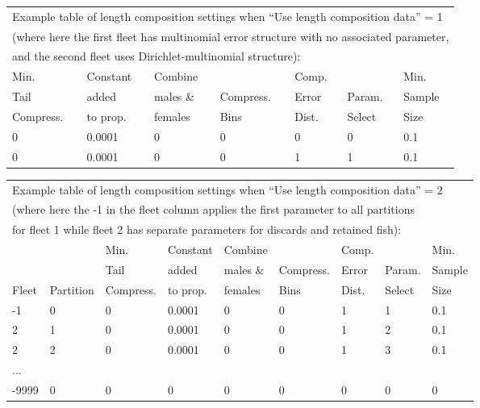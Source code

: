 \begin{tabular}{p{2cm} p{2cm} p{2cm} p{2cm} p{2cm} p{1.5cm} p{1.5cm}}
	\multicolumn{7}{l}{Example table of length composition settings when ``Use length composition data'' = 1} \\
	\multicolumn{7}{l}{(where here the first fleet has multinomial error structure with no associated parameter,} \\ 
	\multicolumn{7}{l}{and the second fleet uses Dirichlet-multinomial structure):} \\
	\hline
	Min.      & Constant & Combine  &           & Comp. &        & Min. \Tstrut\\
	Tail      & added    & males \& & Compress. & Error & Param. & Sample \\
	Compress. & to prop. & females  & Bins      & Dist. & Select & Size \Bstrut\\
	\hline
	0 & 0.0001 & 0 & 0 & 0 & 0 & 0.1 \Tstrut\\
	0 & 0.0001 & 0 & 0 & 1 & 1 & 0.1 \Bstrut\\
	\hline
\end{tabular}

\begin{tabular}{p{1cm} p{1.5cm} p{1.75cm} p{1.5cm} p{1.5cm} p{1.75cm} p{1.25cm} p{1.25cm} p{1.5cm}}
	\multicolumn{9}{l}{Example table of length composition settings when ``Use length composition data'' = 2}\\
	\multicolumn{9}{l}{(where here the -1 in the fleet column applies the first parameter to all partitions} \\
	\multicolumn{9}{l}{for fleet 1 while fleet 2 has separate parameters for discards and retained fish):} \\
	\hline
	        &           & Min.      & Constant & Combine  &           & Comp. &        & Min. \Tstrut\\
	        &           & Tail      & added    & males \& & Compress. & Error & Param. & Sample \\
	Fleet   & Partition & Compress. & to prop. & females  & Bins      & Dist. & Select & Size \Bstrut\\
	\hline
	-1 & 0 & 0 & 0.0001 & 0 & 0 & 1 & 1 & 0.1 \Tstrut\\
	2 & 1 & 0 & 0.0001 & 0 & 0 & 1 & 2 & 0.1 \\
	2 & 2 & 0 & 0.0001 & 0 & 0 & 1 & 3 & 0.1 \\
	... &  &  &        &   &   &   &   &  \\
	-9999 & 0 & 0 & 0 & 0 & 0 & 0 & 0 & 0 \Bstrut\\
	\hline
\end{tabular}

